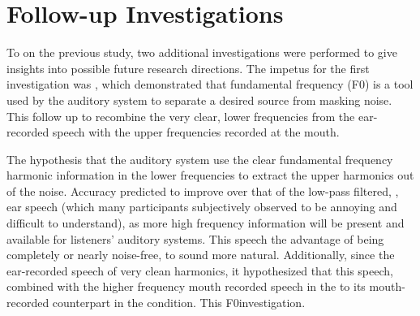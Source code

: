 \DIFdelbegin %
\DIFdelend \DIFaddbegin \section{Follow-up Investigations}
\label{chap3:follow-up-expts}
\DIFaddend 

To \DIFdelbegin {}\DIFdelend \DIFaddbegin {}\DIFaddend on the previous study, two additional investigations were performed to give insights into possible future research directions.  The impetus for the first investigation was \cite{bird:97}, which demonstrated that fundamental frequency (F0) is a tool used by the auditory system to separate a desired source from masking noise.  This follow up \DIFdelbegin {}\DIFdelend \DIFaddbegin {}\DIFaddend to recombine the very clear, lower frequencies from the ear-recorded speech with the \DIFdelbegin {}\DIFdelend \DIFaddbegin {}\DIFaddend upper frequencies recorded at the mouth.  

The hypothesis \DIFdelbegin {}\DIFdelend \DIFaddbegin {}\DIFaddend that the auditory system \DIFdelbegin {}\DIFdelend \DIFaddbegin {}\DIFaddend use the clear fundamental frequency harmonic information in the lower frequencies to extract the upper harmonics out of the noise.  Accuracy \DIFdelbegin {}\DIFdelend \DIFaddbegin {}\DIFaddend predicted to improve over that of the low-pass filtered, \DIFdelbegin {}\DIFdelend \DIFaddbegin {}\DIFaddend , ear speech (which many participants subjectively observed to be annoying and difficult to understand), as more high frequency information will be present and available for listeners' auditory systems.  This speech \DIFdelbegin {}\DIFdelend \DIFaddbegin {}\DIFaddend the advantage of being completely or nearly \DIFdelbegin {}\DIFdelend \DIFaddbegin {}\DIFaddend noise-free\DIFdelbegin {}\DIFdelend \DIFaddbegin {}\DIFaddend , to sound more natural.  Additionally, since the ear-recorded speech \DIFdelbegin {}\DIFdelend \DIFaddbegin {}\DIFaddend of very clean harmonics, it \DIFdelbegin {}\DIFdelend \DIFaddbegin {}\DIFaddend hypothesized that this speech, combined with the higher frequency mouth recorded speech in the \DIFdelbegin {}\DIFdelend \DIFaddbegin {}\DIFaddend to its mouth-recorded counterpart in the \DIFdelbegin {}\DIFdelend \DIFaddbegin {}\DIFaddend condition. This \DIFdelbegin {}\DIFdelend \DIFaddbegin {}\DIFaddend F0\DIFdelbegin {}\DIFdelend \DIFaddbegin {}\DIFaddend investigation.

